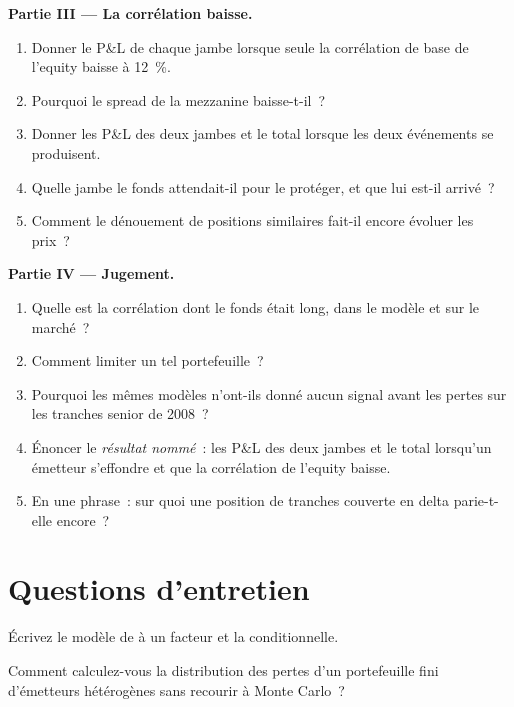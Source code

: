 \begin{problem}
\medskip\noindent\textbf{Partie III --- La corrélation baisse.}
\begin{enumerate}[resume]
\item Donner le P\&L de chaque jambe lorsque seule la corrélation de base de l'equity baisse à 12~\%.
\item Pourquoi le spread de la mezzanine baisse-t-il~?
\item Donner les P\&L des deux jambes et le total lorsque les deux événements se produisent.
\item Quelle jambe le fonds attendait-il pour le protéger, et que lui est-il arrivé~?
\item Comment le dénouement de positions similaires fait-il encore évoluer les prix~?
\end{enumerate}

\medskip\noindent\textbf{Partie IV --- Jugement.}
\begin{enumerate}[resume]
\item Quelle est la corrélation dont le fonds était long, dans le modèle et sur le marché~?
\item Comment limiter un tel portefeuille~?
\item Pourquoi les mêmes modèles n'ont-ils donné aucun signal avant les pertes sur les tranches senior de 2008~?
\item Énoncer le \emph{résultat nommé}~: les P\&L des deux jambes et le total
lorsqu'un émetteur s'effondre et que la corrélation de l'equity baisse.
\item En une phrase~: sur quoi une position de tranches couverte en delta parie-t-elle encore~?
\end{enumerate}
\end{problem}

\section{Questions d'entretien}

\begin{interviewq}\label{iq:rc:portfolio-credit:1}
Écrivez le modèle de  à un facteur et la  conditionnelle.
\end{interviewq}

\begin{interviewq}\label{iq:rc:portfolio-credit:2}
Comment calculez-vous la distribution des pertes d'un portefeuille fini d'émetteurs hétérogènes
sans recourir à Monte Carlo~?
\end{interviewq}

